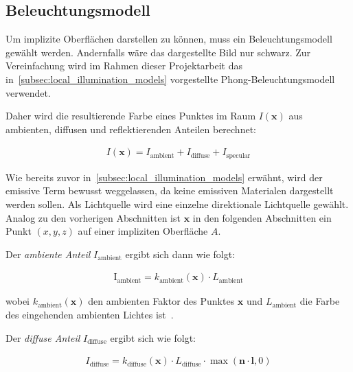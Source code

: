 
\subsection{Beleuchtungsmodell}
\label{sec:rendering_implicit_surfaces_lighting}

Um implizite Oberflächen darstellen zu können, muss ein
Beleuchtungsmodell gewählt werden. Andernfalls wäre  das dargestellte
Bild nur schwarz. Zur Vereinfachung wird im Rahmen dieser Projektarbeit
das in~\autoref{subsec:local_illumination_models} vorgestellte
Phong-Beleuchtungsmodell verwendet.

Daher wird die resultierende Farbe eines Punktes im Raum $I(\bm{x})$ aus
ambienten, diffusen und reflektierenden Anteilen berechnet:

\begin{gather}
    I(\bm{x}) = I_{\text{ambient}} + I_{\text{diffuse}} + I_{\text{specular}}
\end{gather}

Wie bereits zuvor in~\autoref{subsec:local_illumination_models} erwähnt,
wird der emissive Term bewusst weggelassen, da keine emissiven Materialen
dargestellt werden sollen. Als Lichtquelle wird eine einzelne direktionale
Lichtquelle gewählt. Analog zu den vorherigen Abschnitten ist $\bm{x}$
in den folgenden Abschnitten ein Punkt $(x, y, z)$ auf einer impliziten
Oberfläche $A$.

Der \textit{ambiente Anteil} $I_{\text{ambient}}$ ergibt sich dann wie
folgt:

\begin{gather}
    \text{I}_{\text{ambient}} = k_{\text{ambient}}(\bm{x}) \cdot L_{\text{ambient}}
\end{gather}

wobei $k_{\text{ambient}}(\bm{x})$ den ambienten Faktor des
Punktes $\bm{x}$ und $L_{\text{ambient}}$ die Farbe des eingehenden ambienten
Lichtes ist~\parencites[S. 723]{glassner_introduction_1989}[Kapitel 5, Abschnitt 5.2.1]{fernando_cg_2003}.

Der \textit{diffuse Anteil} $I_{\text{diffuse}}$ ergibt sich wie folgt:

\begin{gather}
    I_{\text{diffuse}} = k_{\text{diffuse}}(\bm{x}) \cdot L_{\text{diffuse}} \cdot \max(\bm{n} \cdot \bm{l}, 0)
\end{gather}

